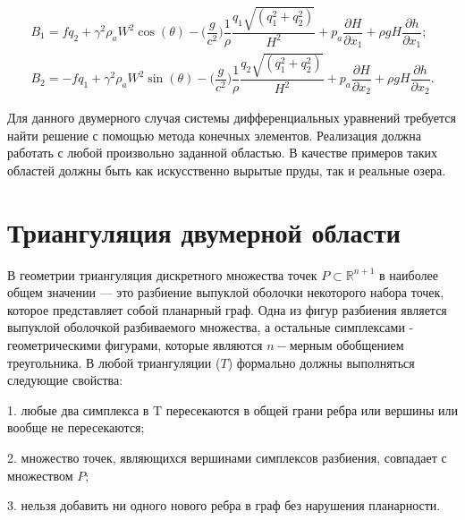 \documentclass[14pt]{extreport}
\begin{document}

\begin{equation}\label{eq:task:2}
\begin{aligned}
B_1=fq_2+\gamma^2\rho_aW^2\cos(\theta)-\bigg(\dfrac{g}{c^2}\bigg)\dfrac{1}{\rho}\dfrac{q_1\sqrt{(q_1^2+q_2^2)}}{H^2} + p_a \dfrac{\partial H}{\partial x_1} + \rho gH\dfrac{\partial h}{\partial x_1}; \\
B_2=-fq_1+\gamma^2\rho_aW^2\sin(\theta)-\bigg(\dfrac{g}{c^2}\bigg)\dfrac{1}{\rho}\dfrac{q_2\sqrt{(q_1^2+q_2^2)}}{H^2} + p_a \dfrac{\partial H}{\partial x_2} + \rho gH\dfrac{\partial h}{\partial x_2}.
\end{aligned}
\end{equation}

Для данного двумерного случая системы дифференциальных уравнений требуется найти решение с помощью метода конечных элементов. Реализация должна работать с любой произвольно заданной областью. В качестве примеров таких областей должны быть как искусственно вырытые пруды, так и реальные озера. 

\section{Триангуляция двумерной области}

В геометрии триангуляция дискретного множества точек $P\subset {\mathbb  {R}}^{{n+1}}$ в наиболее общем значении — это разбиение  выпуклой оболочки некоторого набора точек, которое представляет собой планарный граф\cite{bib:triangle:delone}. Одна из фигур разбиения является выпуклой оболочкой разбиваемого множества, а остальные симплексами -  геометрическими фигурами, которые являются $n-$мерным обобщением треугольника. В любой триангуляции ($T$) формально должны выполняться следующие свойства:

	1. любые два симплекса в T пересекаются в общей грани ребра или вершины или вообще не пересекаются;

	2. множество точек, являющихся вершинами симплексов разбиения, совпадает с множеством $P$;
	
	3. нельзя добавить ни одного нового ребра в граф без нарушения планарности.
\end{document}
